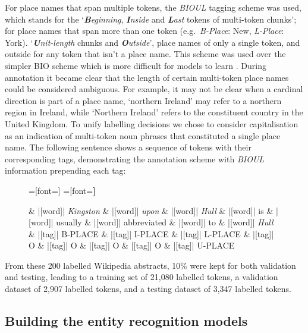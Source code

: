 \documentclass[]{interact}
\theoremstyle{plain}%
\theoremstyle{definition}
\theoremstyle{remark}
\begin{document}
For place names that span multiple tokens, the \emph{BIOUL} tagging
scheme was used, which stands for the `\emph{\textbf{B}eginning},
\emph{\textbf{I}nside} and \emph{\textbf{L}ast} tokens of multi-token
chunks'; for place names that span more than one token
(e.g.~\emph{B-Place}: New, \emph{L-Place}: York).
`\emph{\textbf{U}nit-length} chunks and \emph{\textbf{O}utside}', place
names of only a single token, and outside for any token that isn't a
place name. This scheme was used over the simpler BIO scheme which is
more difficult for models to learn \citep{ratinov2009}. During
annotation it became clear that the length of certain multi-token place
names could be considered ambiguous. For example, it may not be clear
when a cardinal direction is part of a place name, `northern Ireland'
may refer to a northern region in Ireland, while `Northern Ireland'
refers to the constituent country in the United Kingdom. To unify
labelling decisions we chose to consider capitalisation as an indication
of multi-token noun phrases that constituted a single place name. The
following sentence shows a sequence of tokens with their corresponding
tags, demonstrating the annotation scheme with \emph{BIOUL} information
prepending each tag:

\begin{figure}[H]
\centering
\begin{dependency}
=[font=\normalsize]
=[font=\bfseries\tiny]
\begin{deptext}[column sep=0.05cm, row sep=0.1cm]
\& |[word]| \textit{Kingston} \& |[word]| \textit{upon} \& |[word]| \textit{Hull} \& |[word]| is
\& |[word]| usually \& |[word]| abbreviated  \& |[word]| to \& |[word]| \textit{Hull} \\
\& |[tag]| B-PLACE \& |[tag]| I-PLACE \& |[tag]| L-PLACE \& |[tag]| O
\& |[tag]| O \& |[tag]| O \& |[tag]| O \& |[tag]| U-PLACE \\
\end{deptext}
\end{dependency}
\end{figure}

From these 200 labelled Wikipedia abstracts, 10\% were kept for both
validation and testing, leading to a training set of 21,080 labelled
tokens, a validation dataset of 2,907 labelled tokens, and a testing
dataset of 3,347 labelled tokens.

\hypertarget{building-the-entity-recognition-models}{%
\subsection{Building the entity recognition
models}\label{building-the-entity-recognition-models}}
\end{document}
